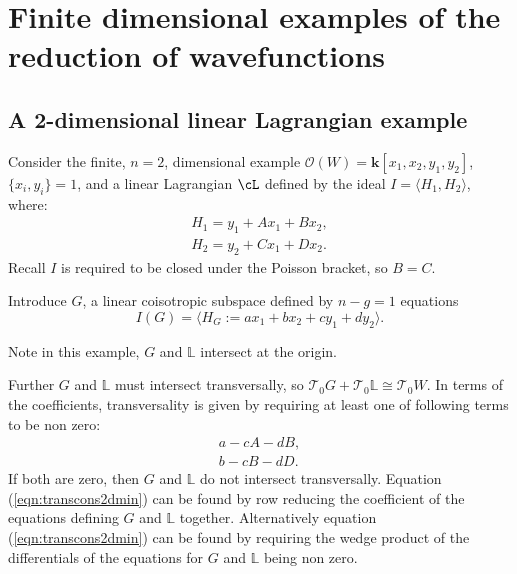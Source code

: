     \section{Finite dimensional examples of the reduction of wavefunctions}

    \subsection{A 2-dimensional linear Lagrangian example}
    
    \label{subsec:2dimredex}
    
    \begin{ex}    
    Consider the finite, \(n=2\), dimensional example \( \mathcal{O}(W) =   \mathbf{k}[x_1,x_2,y_1,y_2]\), \( \{x_i,y_i\}=1\), and a linear Lagrangian \( \cL\) defined by the ideal \(I = \langle H_1, H_2\rangle\), where:
    \begin{align*}
        H_1 = y_1 + A x_1 +  B x_2,    \\
        H_2 = y_2 +  C x_1 + D x_2. 
    \end{align*}
    Recall \( I\) is required to be closed under the Poisson bracket, so \(B=C\).
    
    Introduce \(G\), a linear coisotropic subspace defined by \(n-g=1\) equations
    \[ I(G) = \langle H_G :=a x_1 + b x_2 + c y_1 + d y_2 \rangle.\]
    \end{ex}
    Note in this example, \( G\) and \( \mathbb{L}\) intersect at the origin. 
    
    
    Further \(G\) and \( \mathbb{L}\) must intersect transversally, so \( \mathcal{T}_0 G+ \mathcal{T}_0{\mathbb{L}} \cong \mathcal{T}_0W\). In terms of the coefficients, transversality is given by requiring at least one of following terms to be non zero:
    \begin{align}
    \label{eqn:transcons2dmin}
    a - cA - dB, \\ 
    b - cB-dD.
    \end{align}
    If both are zero, then \(G\) and \( \mathbb{L}\) do not intersect transversally. Equation (\ref{eqn:transcons2dmin}) can be found by row reducing the coefficient of the equations defining \(G\) and \( \mathbb{L}\) together. Alternatively equation (\ref{eqn:transcons2dmin}) can be found by requiring the wedge product of the differentials of the equations for \(G\) and \( \mathbb{L}\) being non zero. 
    
